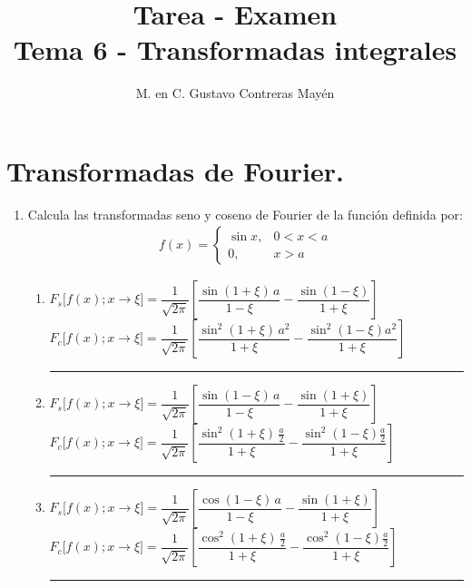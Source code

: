 
\title{Tarea - Examen \\ \large {Tema 6 - Transformadas integrales} \vspace{-3ex}}
\author{M. en C. Gustavo Contreras Mayén}
\date{ }

\vspace{-4cm}
\maketitle
\fontsize{14}{14}\selectfont
\section{Transformadas de Fourier.}
\begin{enumerate}
\item Calcula las transformadas seno y coseno de Fourier de la función definida por:
\begin{align*}
f(x) = \begin{cases}
\sin x, & 0 < x < a \\
0, & x > a
\end{cases}
\end{align*}
\begin{enumerate}[label=1.\alph*)]
\setlength\itemsep{2em}
\item $F_{s} \big[f(x); x \to \xi \big] = \dfrac{1}{\sqrt{2 \pi}} \left[ \dfrac{\sin (1 + \xi) \, a}{1 - \xi} - \dfrac{\sin(1 - \xi)}{1 + \xi} \right]$
\mbox{}\\$F_{c} \big[f(x); x \to \xi \big] = \dfrac{1}{\sqrt{2 \pi}} \left[ \dfrac{\sin^{2} (1 + \xi) \, a^{2}}{1 + \xi} - \dfrac{\sin^{2}(1 - \xi) a^{2}}{1 + \xi} \right]$ \hrule
\item $F_{s} \big[f(x); x \to \xi \big] = \dfrac{1}{\sqrt{2 \pi}} \left[ \dfrac{\sin (1 - \xi) \, a}{1 - \xi} - \dfrac{\sin(1 + \xi)}{1 + \xi} \right]$
\mbox{}\\$F_{c} \big[f(x); x \to \xi \big] = \dfrac{1}{\sqrt{2 \pi}} \left[ \dfrac{\sin^{2} (1 + \xi) \, \frac{a}{2}}{1 + \xi} - \dfrac{\sin^{2}(1 - \xi)\frac{a}{2}}{1 + \xi} \right]$ \hrule
\item $F_{s} \big[f(x); x \to \xi \big] = \dfrac{1}{\sqrt{2 \pi}} \left[ \dfrac{\cos (1 - \xi) \, a}{1 - \xi} - \dfrac{\sin(1 + \xi)}{1 + \xi} \right]$
\mbox{}\\$F_{c} \big[f(x); x \to \xi \big] = \dfrac{1}{\sqrt{2 \pi}} \left[ \dfrac{\cos^{2} (1 + \xi) \, \frac{a}{2}}{1 + \xi} - \dfrac{\cos^{2}(1 - \xi)\frac{a}{2}}{1 + \xi} \right]$ \hrule

\end{enumerate}
\end{enumerate}
